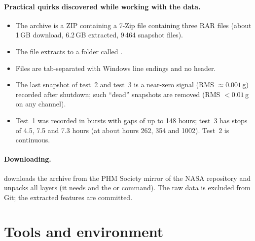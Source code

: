 \documentclass[11pt]{article}
\begin{document}
\paragraph{Practical quirks discovered while working with the data.}
\begin{itemize}
  \item The archive is a ZIP containing a 7-Zip file containing three RAR files (about 1\,GB download,
        6.2\,GB extracted, 9\,464 snapshot files).
  \item The file  extracts to a folder called .
  \item Files are tab-separated with Windows line endings and no header.
  \item The last snapshot of test~2 and test~3 is a near-zero signal (RMS $\approx 0.001$\,g) recorded
        after shutdown; such ``dead'' snapshots are removed (RMS $< 0.01$\,g on any channel).
  \item Test~1 was recorded in bursts with gaps of up to 148 hours; test~3 has stops of 4.5, 7.5 and
        7.3 hours (at about hours 262, 354 and 1002). Test~2 is continuous.
\end{itemize}

\paragraph{Downloading.}  downloads the archive from the PHM Society
mirror of the NASA repository and unpacks all layers (it needs  and the  or
 command). The raw data is excluded from Git; the extracted features are committed.

\section{Tools and environment}
\end{document}
